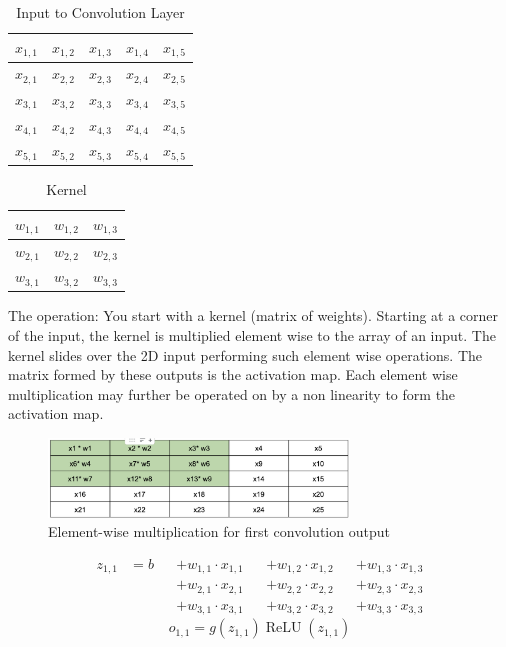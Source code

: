 \documentclass[11pt, twosides]{article}
\begin{document}
\begin{table}[H]
  \centering
  \begin{tabular}
    { | c|c|c|c|c | } 
    \hline $x_{1,1}$ & $x_{1,2}$ & $x_{1,3}$ & $x_{1,4}$ & $x_{1,5}$ \\
    \hline $x_{2,1}$ & $x_{2,2}$ & $x_{2,3}$ & $x_{2,4}$ & $x_{2,5}$ \\
    \hline $x_{3,1}$ & $x_{3,2}$ & $x_{3,3}$ & $x_{3,4}$ & $x_{3,5}$ \\
    \hline $x_{4,1}$ & $x_{4,2}$ & $x_{4,3}$ & $x_{4,4}$ & $x_{4,5}$ \\
    \hline $x_{5,1}$ & $x_{5,2}$ & $x_{5,3}$ & $x_{5,4}$ & $x_{5,5}$ \\
    \hline
  \end{tabular}
  \caption{Input to Convolution Layer}
  \label{fig:my_label}
\end{table}
  

\begin{table}[H]
  \centering
  \begin{tabular}
    { | c | c | c | } 
    \hline $w_{1,1}$ & $w_{1,2}$ & $w_{1,3}$ \\
    \hline $w_{2,1}$ & $w_{2,2}$ & $w_{2,3}$ \\
    \hline $w_{3,1}$ & $w_{3,2}$ & $w_{3,3}$ \\
    \hline
  \end{tabular}
  \caption{Kernel}
  \label{fig:my_label}
\end{table}

The operation: You start with a kernel (matrix of weights). Starting at a corner of the input, the kernel is multiplied element wise to the array of an input. The kernel slides over the 2D input performing such element wise operations. The matrix formed by these outputs is the activation map. Each element wise multiplication may further be operated on by a non linearity to form the activation map. 

\begin{figure}[htp]
    \centering
    \includegraphics[width=8cm]{first.png}
    \caption{Element-wise multiplication for first convolution output}
    \label{fig:galaxy}
\end{figure}

\begin{align*}
    z_{1,1} &= b &&+ w_{1,1} \cdot x_{1,1} && + w_{1,2} \cdot x_{1,2} && + w_{1,3} \cdot x_{1,3} \\
            &    &&+ w_{2,1} \cdot x_{2,1} && + w_{2,2} \cdot x_{2,2} && + w_{2,3} \cdot x_{2,3} \\
            &    &&+ w_{3,1} \cdot x_{3,1} && + w_{3,2} \cdot x_{3,2} && + w_{3,3} \cdot x_{3,3}
\end{align*}
\begin{equation*}
    o_{1,1} = g(z_{1,1}) \operatorname{ReLU}(z_{1,1})
\end{equation*}
\end{document}
